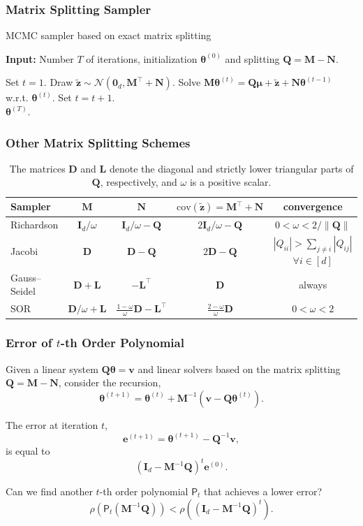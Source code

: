 \documentclass[aspectratio=169]{beamer}
\newcommand{\B}[1]{\mathbf{#1}} %
\newcommand{\Bs}[1]{\boldsymbol{#1}} %
\newcommand{\nr}[1]{\left\|#1\right\|} %
\begin{document}
\begin{frame}
\frametitle{Matrix Splitting Sampler}
\begin{algorithm}[H]
\caption{MCMC sampler based on exact matrix splitting}
\hspace*{\algorithmicindent} \textbf{Input:} Number $T$ of iterations, initialization $\Bs{\theta}^{(0)}$ and splitting $\B{Q} = \B{M} - \B{N}$.
\begin{algorithmic}[1]
\State Set $t=1$.
    \State Draw $\tilde{\B{z}} \sim \mathcal{N}(\B{0}_d,\B{M}^{\top} + \B{N})$.
    \State Solve $\B{M}\Bs{\theta}^{(t)} = \B{Q}\Bs{\mu} + \tilde{\B{z}} + \B{N}\Bs{\theta}^{(t-1)} $ w.r.t. $\Bs{\theta}^{(t)}$.
    \State Set $t = t + 1$.
\EndWhile\\
\Return $\Bs{\theta}^{(T)}$.
\end{algorithmic}
\end{algorithm}
\end{frame}

\begin{frame}
\frametitle{Other Matrix Splitting Schemes}
\begin{table}
{\footnotesize
\caption{The matrices $\B{D}$ and $\B{L}$ denote the diagonal and strictly lower triangular parts of $\B{Q}$, respectively, and $\omega$ is a positive scalar.}
\begin{center}
{\renewcommand{\arraystretch}{1.5}
\begin{tabular}{|l|c|c|c|c|} 
    \hline
    \textbf{Sampler} & $\B{M}$ & $\B{N}$ & $\text{cov}(\tilde{\B{z}}) = \B{M}^{\top} + \B{N}$ & convergence\\
    \hline 
    Richardson & $\B{I}_d/\omega$ & $\B{I}_d/\omega - \B{Q}$ & $2\B{I}_d/\omega - \B{Q}$ & $0 < \omega < 2/\nr{\B{Q}}$\\ 
    Jacobi & $\B{D}$ & $\B{D} - \B{Q}$ & $2\B{D} - \B{Q}$ & $|Q_{ii}| > \sum_{j\neq i}|Q_{ij}|$ $\forall i \in [d]$\\
    Gauss--Seidel & $\B{D} + \B{L}$ & $-\B{L}^{\top}$ & $\B{D}$ & always\\
    SOR & $\B{D}/\omega + \B{L}$ & $\frac{1-\omega}{\omega}\B{D} - \B{L}^{\top}$ & $\frac{2-\omega}{\omega}\B{D}$ & $0 < \omega < 2$\\[1em]
    \hline
\end{tabular}}
\end{center}
}
\end{table}
\end{frame}

\begin{frame}
\frametitle{Error of $t$-th Order Polynomial}
Given a linear system $\B{Q}\Bs{\theta} = \B{v}$ and linear solvers based on the matrix splitting $\B{Q} = \B{M}-\B{N}$, consider the recursion,
\[\Bs{\theta}^{(t+1)} = \Bs{\theta}^{(t)} +  \B{M}^{-1}(\B{v}-\B{Q}\Bs{\theta}^{(t)}).\]

The error at iteration $t$,
\[\B{e}^{(t+1)} = \Bs{\theta}^{(t+1)} - \B{Q}^{-1}\B{v},\]
is equal to 
\[(\B{I}_d-\B{M}^{-1}\B{Q})^t\B{e}^{(0)}.\]

Can we find another $t$-th order polynomial $\mathsf{P}_t$ that achieves a lower error?
\[\rho(\mathsf{P}_t(\B{M}^{-1}\B{Q})) < \rho((\B{I}_d-\B{M}^{-1}\B{Q})^t).\]
\end{frame}
\end{document}
